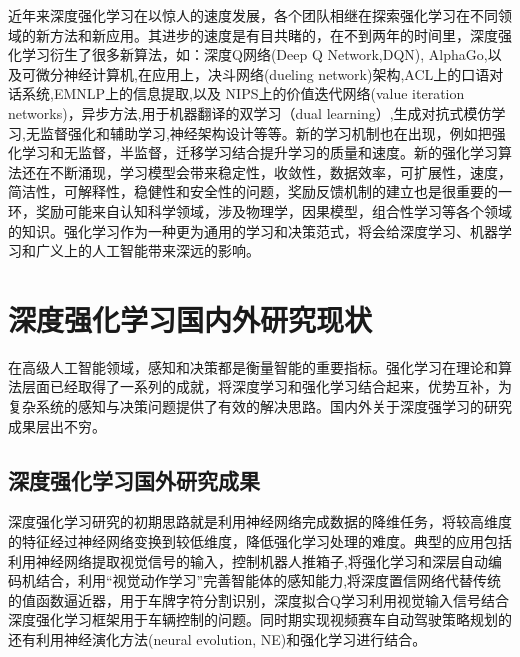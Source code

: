 近年来深度强化学习在以惊人的速度发展，各个团队相继在探索强化学习在不同领域的新方法和新应用。其进步的速度是有目共睹的，在不到两年的时间里，深度强化学习衍生了很多新算法，如：深度Q网络(Deep Q Network,DQN)\cite{Roderick2017Implementing}, AlphaGo\cite{Silver2016Mastering},以及可微分神经计算机\cite{Graves2016Hybrid},在应用上，决斗网络(dueling network)架构\cite{Wang2015Dueling},ACL上的口语对话系统\cite{Su2016On},EMNLP上的信息提取\cite{Narasimhan2016Improving},以及 NIPS上的价值迭代网络(value iteration networks)\cite{Tamar2017Value}，异步方法\cite{Mnih2016Asynchronous},用于机器翻译的双学习（dual learning）\cite{Xia2016Dual},生成对抗式模仿学习\cite{Ho2016Generative},无监督强化和辅助学习\cite{Jaderberg2016Reinforcement},神经架构设计\cite{Pham2018Efficient}等等。新的学习机制也在出现，例如把强化学习和无监督，半监督，迁移学习结合提升学习的质量和速度。新的强化学习算法还在不断涌现，学习模型会带来稳定性，收敛性，数据效率，可扩展性，速度，简洁性，可解释性，稳健性和安全性的问题，奖励反馈机制的建立也是很重要的一环，奖励可能来自认知科学领域，涉及物理学，因果模型，组合性学习等各个领域的知识。强化学习作为一种更为通用的学习和决策范式，将会给深度学习、机器学习和广义上的人工智能带来深远的影响。

\section{深度强化学习国内外研究现状}
在高级人工智能领域，感知和决策都是衡量智能的重要指标。强化学习在理论和算法层面已经取得了一系列的成就，将深度学习和强化学习结合起来，优势互补，为复杂系统的感知与决策问题提供了有效的解决思路。国内外关于深度强学习的研究成果层出不穷。

\subsection{深度强化学习国外研究成果}
深度强化学习研究的初期思路就是利用神经网络完成数据的降维任务，将较高维度的特征经过神经网络变换到较低维度，降低强化学习处理的难度。典型的应用包括利用神经网络提取视觉信号的输入，控制机器人推箱子\cite{Shibata2003Acquisition},将强化学习和深层自动编码机结合，利用“视觉动作学习”完善智能体的感知能力\cite{Lange2010Deep},将深度置信网络代替传统的值函数逼近器，用于车牌字符分割识别\cite{Abtahi2015A}，深度拟合Q学习利用视觉输入信号结合深度强化学习框架用于车辆控制的问题。同时期实现视频赛车自动驾驶策略规划的还有利用神经演化方法(neural evolution, NE)和强化学习进行结合\cite{Kumar2014Understanding}。

